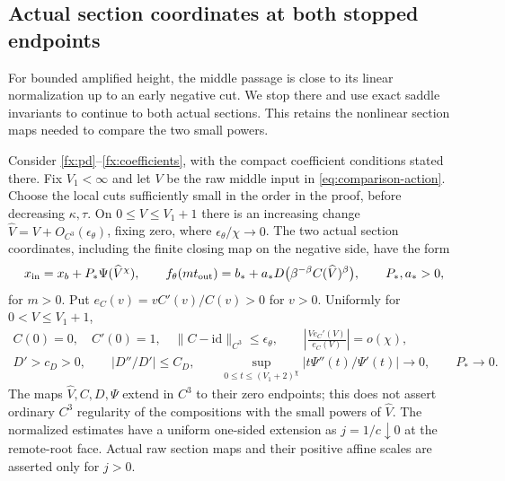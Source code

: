 \subsection{Actual section coordinates at both stopped endpoints}
\label{subsec:actual-dulac-matching}

For bounded amplified height, the middle passage is close to its linear
normalization up to an early negative cut. We stop there and use exact
saddle invariants to continue to both actual sections. This retains the
nonlinear section maps needed to compare the two small powers.

\begin{lemma}
\label{lem:actual-dulac-matching}
Consider \eqref{fx:pd}--\eqref{fx:coefficients}, with the compact
coefficient conditions stated there. Fix \(V_1<\infty\) and let
\(V\) be the raw middle input in \eqref{eq:comparison-action}.
Choose the local cuts sufficiently small in the order in the proof,
before decreasing \(\kappa,\tau\).
On \(0\le V\le V_1+1\) there is an increasing change
\(\widehat V=V+O_{C^3}(\epsilon_\theta)\), fixing zero, where
\(\epsilon_\theta/\chi\to0\). The two actual section coordinates,
including the finite closing map on the negative side, have the form
\begin{equation}\label{eq:actual-dulac-pair}
 x_{\rm in}=x_b+P_*\Psi(\widehat V^\chi),\qquad
 f_\theta(mt_{\rm out})=b_*+a_*D
       \bigl(\beta^{-\beta}C(\widehat V)^\beta\bigr),
 \qquad P_*,a_*>0,
\end{equation}
for \(m>0\). Put \(e_C(v)=vC'(v)/C(v)>0\) for \(v>0\).
Uniformly for \(0<V\le V_1+1\),
\begin{equation}\label{eq:actual-dulac-bounds}
 \begin{gathered}
 C(0)=0,\quad C'(0)=1,\quad
 \|C-\mathrm{id}\|_{C^3}\le\epsilon_\theta,\qquad
 \left|\frac{V e_C'(V)}{e_C(V)}\right|=o(\chi),\\
 D'>c_D>0,\qquad |D''/D'|\le C_D,\qquad
 \sup_{0\le t\le(V_1+2)^\chi}
       |t\Psi''(t)/\Psi'(t)|\longrightarrow0,\qquad P_*\to0 .
 \end{gathered}
\end{equation}
The maps \(\widehat V,C,D,\Psi\) extend in \(C^3\) to their
zero endpoints; this does not assert ordinary \(C^3\) regularity
of the compositions with the small powers of \(\widehat V\).
The normalized estimates have a uniform one-sided extension as
\(j=1/c\downarrow0\) at the remote-root face. Actual raw section
maps and their positive affine scales are asserted only for \(j>0\).
\end{lemma}

